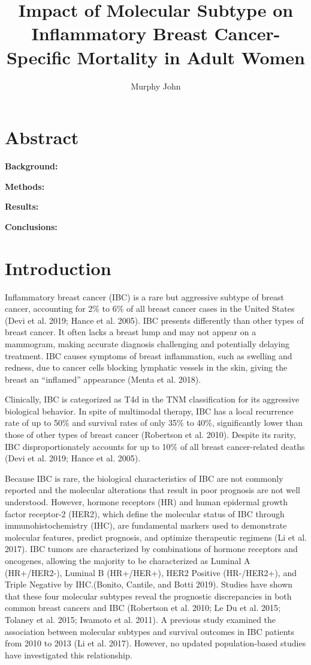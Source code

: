 \documentclass[
  letterpaper,
  DIV=11,
  numbers=noendperiod]{scrartcl}
\title{Impact of Molecular Subtype on Inflammatory Breast
Cancer-Specific Mortality in Adult Women}
\author{Murphy John}
\date{}
\begin{document}
\maketitle


\pagebreak

\section{Abstract}\label{abstract}

\textbf{Background:}

\textbf{Methods:}

\textbf{Results:}

\textbf{Conclusions:}

\pagebreak

\section{Introduction}\label{introduction}

Inflammatory breast cancer (IBC) is a rare but aggressive subtype of
breast cancer, accounting for 2\% to 6\% of all breast cancer cases in
the United States (Devi et al. 2019; Hance et al. 2005). IBC presents
differently than other types of breast cancer. It often lacks a breast
lump and may not appear on a mammogram, making accurate diagnosis
challenging and potentially delaying treatment. IBC causes symptoms of
breast inflammation, such as swelling and redness, due to cancer cells
blocking lymphatic vessels in the skin, giving the breast an
``inflamed'' appearance (Menta et al. 2018).

Clinically, IBC is categorized as T4d in the TNM classification for its
aggressive biological behavior. In spite of multimodal therapy, IBC has
a local recurrence rate of up to 50\% and survival rates of only 35\% to
40\%, significantly lower than those of other types of breast cancer
(Robertson et al. 2010). Despite its rarity, IBC disproportionately
accounts for up to 10\% of all breast cancer-related deaths (Devi et al.
2019; Hance et al. 2005).

Because IBC is rare, the biological characteristics of IBC are not
commonly reported and the molecular alterations that result in poor
prognosis are not well understood. However, hormone receptors (HR) and
human epidermal growth factor receptor-2 (HER2), which define the
molecular status of IBC through immunohistochemistry (IHC), are
fundamental markers used to demonstrate molecular features, predict
prognosis, and optimize therapeutic regimens (Li et al. 2017). IBC
tumors are characterized by combinations of hormone receptors and
oncogenes, allowing the majority to be characterized as Luminal A
(HR+/HER2-), Luminal B (HR+/HER+), HER2 Positive (HR-/HER2+), and Triple
Negative by IHC.(Bonito, Cantile, and Botti 2019). Studies have shown
that these four molecular subtypes reveal the prognostic discrepancies
in both common breast cancers and IBC (Robertson et al. 2010; Le Du et
al. 2015; Tolaney et al. 2015; Iwamoto et al. 2011). A previous study
examined the association between molecular subtypes and survival
outcomes in IBC patients from 2010 to 2013 (Li et al. 2017). However, no
updated population-based studies have investigated this relationship.
\end{document}
